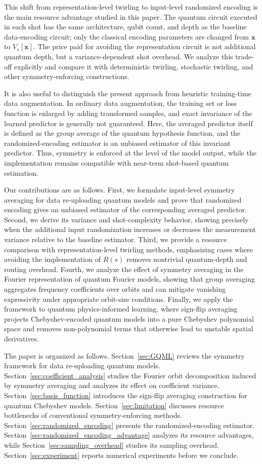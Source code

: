 \documentclass[%
 reprint,
 amsmath,amssymb,
 aps,
 pra,
]{revtex4-2}
\theoremstyle{definition}
\begin{document}
This shift from representation-level twirling to input-level randomized encoding is the main resource advantage studied in this paper. The quantum circuit executed in each shot has the same architecture, qubit count, and depth as the baseline data-encoding circuit; only the classical encoding parameters are changed from \(\bm{x}\) to \(V_s[\bm{x}]\). The price paid for avoiding the representation circuit is not additional quantum depth, but a variance-dependent shot overhead. We analyze this trade-off explicitly and compare it with deterministic twirling, stochastic twirling, and other symmetry-enforcing constructions.

It is also useful to distinguish the present approach from heuristic training-time data augmentation. In ordinary data augmentation, the training set or loss function is enlarged by adding transformed samples, and exact invariance of the learned predictor is generally not guaranteed. Here, the averaged predictor itself is defined as the group average of the quantum hypothesis function, and the randomized-encoding estimator is an unbiased estimator of this invariant predictor. Thus, symmetry is enforced at the level of the model output, while the implementation remains compatible with near-term shot-based quantum estimation.

Our contributions are as follows. First, we formulate input-level symmetry averaging for data re-uploading quantum models and prove that randomized encoding gives an unbiased estimator of the corresponding averaged predictor. Second, we derive its variance and shot-complexity behavior, showing precisely when the additional input randomization increases or decreases the measurement variance relative to the baseline estimator. Third, we provide a resource comparison with representation-level twirling methods, emphasizing cases where avoiding the implementation of \(R(s)\) removes nontrivial quantum-depth and routing overhead. Fourth, we analyze the effect of symmetry averaging in the Fourier representation of quantum Fourier models, showing that group averaging aggregates frequency coefficients over orbits and can mitigate vanishing expressivity under appropriate orbit-size conditions. Finally, we apply the framework to quantum physics-informed learning, where sign-flip averaging projects Chebyshev-encoded quantum models into a pure Chebyshev polynomial space and removes non-polynomial terms that otherwise lead to unstable spatial derivatives.

The paper is organized as follows. Section~\ref{sec:GQML} reviews the symmetry framework for data re-uploading quantum models. Section~\ref{sec:coefficient_analysis} studies the Fourier orbit decomposition induced by symmetry averaging and analyzes its effect on coefficient variance. Section~\ref{sec:basis_function} introduces the sign-flip averaging construction for quantum Chebyshev models. Section~\ref{sec:limitation} discusses resource bottlenecks of conventional symmetry-enforcing methods. Section~\ref{sec:randomized_encoding} presents the randomized-encoding estimator. Section~\ref{sec:randomized_encoding_advantage} analyzes its resource advantages, while Section~\ref{sec:sampling_overhead} studies its sampling overhead. Section~\ref{sec:experiment} reports numerical experiments before we conclude.
\end{document}
